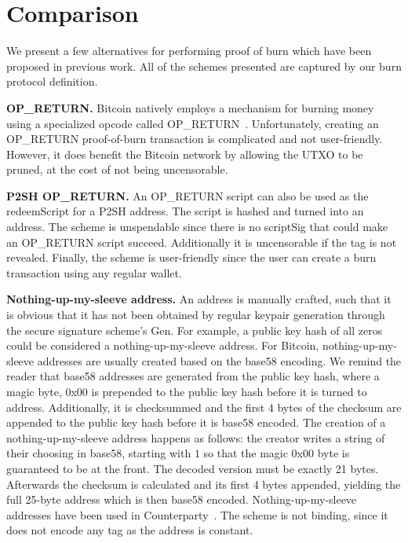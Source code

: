 \section{Comparison}

We present a few alternatives for performing proof of burn which have been proposed in previous work. All of the schemes presented are captured by our burn protocol definition.

\noindent
\textbf{OP\_RETURN.}
Bitcoin natively employs a mechanism for burning money using a specialized
opcode called OP\_RETURN~\cite{bartoletti2017analysis}. Unfortunately,
creating an OP\_RETURN proof-of-burn transaction is complicated and not
user-friendly. However, it does benefit the Bitcoin network by allowing the UTXO
to be pruned, at the cost of not being uncensorable.

\noindent
\textbf{P2SH OP\_RETURN.}
An OP\_RETURN script can also be used as the redeemScript for a P2SH address. The script is hashed and turned into an address. The scheme is unspendable since there is no scriptSig that could make an OP\_RETURN script succeed. Additionally it is uncensorable if the tag is not revealed. Finally, the scheme is user-friendly since the user can create a burn transaction using any regular wallet.

\noindent
\textbf{Nothing-up-my-sleeve address.}
An address is manually crafted, such that it is obvious that it has not been obtained by regular keypair generation through the secure signature scheme's \textsf{Gen}. For example, a public key hash of all zeros could be considered a nothing-up-my-sleeve address. For Bitcoin, nothing-up-my-sleeve addresses are usually created based on the base58 encoding. We remind the reader that base58 addresses are generated from the public key hash, where a magic byte, 0x00 is prepended to the public key hash before it is turned to address. Additionally, it is checksummed and the first 4 bytes of the checksum are appended to the public key hash before it is base58 encoded. The creation of a nothing-up-my-sleeve address happens as follows: the creator writes a string of their choosing in base58, starting with $1$ so that the magic 0x00 byte is guaranteed to be at the front. The decoded version must be exactly 21 bytes. Afterwards the checksum is calculated and its first 4 bytes appended, yielding the full 25-byte address which is then base58 encoded. Nothing-up-my-sleeve addresses have been used in Counterparty~\cite{counterparty}. The scheme is not binding, since it does not encode any tag as the address is constant.

